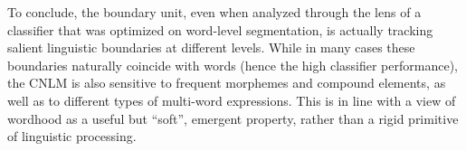 To conclude, the boundary unit, even when
analyzed through the lens of a classifier that was optimized on
word-level segmentation, is actually tracking salient linguistic
boundaries at different levels. While in many cases these boundaries
naturally coincide with words (hence the high classifier performance),
the CNLM is also sensitive to frequent morphemes and compound
elements, as well as to different types of multi-word
expressions. This is in line with a view of wordhood as a useful but
``soft'', emergent property, rather than a rigid primitive of
linguistic processing.










